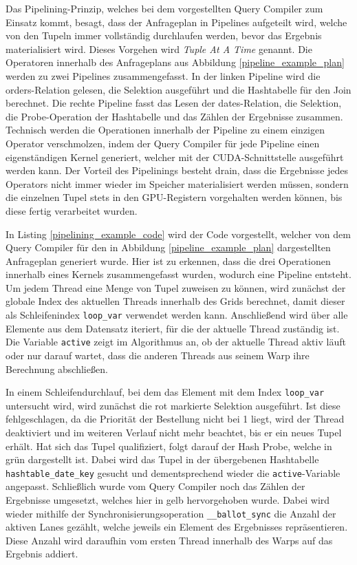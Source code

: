 Das Pipelining-Prinzip, welches bei dem vorgestellten Query Compiler zum Einsatz kommt, besagt, dass der Anfrageplan in Pipelines aufgeteilt wird, welche von den Tupeln immer vollständig durchlaufen werden, bevor das Ergebnis materialisiert wird.
Dieses Vorgehen wird \emph{Tuple At A Time} genannt.
Die Operatoren innerhalb des Anfrageplans aus Abbildung \ref{pipeline_example_plan} werden zu zwei Pipelines zusammengefasst.
In der linken Pipeline wird die \textsf{orders}-Relation gelesen, die Selektion ausgeführt und die Hashtabelle für den Join berechnet.
Die rechte Pipeline fasst das Lesen der \textsf{dates}-Relation, die Selektion, die Probe-Operation der Hashtabelle und das Zählen der Ergebnisse zusammen.
Technisch werden die Operationen innerhalb der Pipeline zu einem einzigen Operator verschmolzen, indem der Query Compiler für jede Pipeline einen eigenständigen Kernel generiert, welcher mit der CUDA-Schnittstelle ausgeführt werden kann.
Der Vorteil des Pipelinings besteht drain, dass die Ergebnisse jedes Operators nicht immer wieder im Speicher materialisiert werden müssen, sondern die einzelnen Tupel stets in den GPU-Registern vorgehalten werden können, bis diese fertig verarbeitet wurden.

In Listing \ref{pipelining_example_code} wird der Code vorgestellt, welcher von dem Query Compiler für den in Abbildung \ref{pipeline_example_plan} dargestellten Anfrageplan generiert wurde.
Hier ist zu erkennen, dass die drei Operationen innerhalb eines Kernels zusammengefasst wurden, wodurch eine Pipeline entsteht.
Um jedem Thread eine Menge von Tupel zuweisen zu können, wird zunächst der globale Index des aktuellen Threads innerhalb des Grids berechnet, damit dieser als Schleifenindex \texttt{loop\_var} verwendet werden kann.
Anschließend wird über alle Elemente aus dem Datensatz iteriert, für die der aktuelle Thread zuständig ist.
Die Variable \texttt{active} zeigt im Algorithmus an, ob der aktuelle Thread aktiv läuft oder nur darauf wartet, dass die anderen Threads aus seinem Warp ihre Berechnung abschließen.

In einem Schleifendurchlauf, bei dem das Element mit dem Index \texttt{loop\_var} untersucht wird, wird zunächst die rot markierte Selektion ausgeführt.
Ist diese fehlgeschlagen, da die Priorität der Bestellung nicht bei 1 liegt, wird der Thread deaktiviert und im weiteren Verlauf nicht mehr beachtet, bis er ein neues Tupel erhält.
Hat sich das Tupel qualifiziert, folgt darauf der Hash Probe, welche in grün dargestellt ist.
Dabei wird das Tupel in der übergebenen Hashtabelle \texttt{hashtable\_date\_key} gesucht und dementsprechend wieder die \texttt{active}-Variable angepasst.
Schließlich wurde vom Query Compiler noch das Zählen der Ergebnisse umgesetzt, welches hier in gelb hervorgehoben wurde.
Dabei wird wieder mithilfe der Synchronisierungsoperation \texttt{\_\_ballot\_sync} die Anzahl der aktiven Lanes gezählt, welche jeweils ein Element des Ergebnisses repräsentieren.
Diese Anzahl wird daraufhin vom ersten Thread innerhalb des Warps auf das Ergebnis addiert. 

